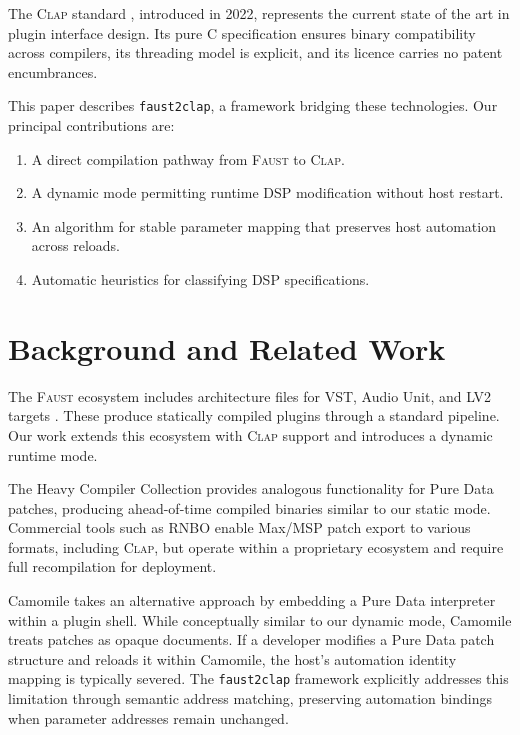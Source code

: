 \documentclass[twoside,a4paper]{article}
\newcommand{\F}{\textsc{Faust}}
\newcommand{\CLAP}{\textsc{Clap}}
\begin{document}
The \CLAP{} standard \cite{CLAP2022}, introduced in 2022, represents the current state of the art in plugin interface design. Its pure C specification ensures binary compatibility across compilers, its threading model is explicit, and its licence carries no patent encumbrances.

This paper describes \texttt{faust2clap}, a framework bridging these technologies. Our principal contributions are:

\begin{enumerate}
\item A direct compilation pathway from \F{} to \CLAP{}.
\item A dynamic mode permitting runtime DSP modification without host restart.
\item An algorithm for stable parameter mapping that preserves host automation across reloads.
\item Automatic heuristics for classifying DSP specifications.
\end{enumerate}

\section{Background and Related Work}
\label{sec:background}

The \F{} ecosystem includes architecture files for VST, Audio Unit, and LV2 targets \cite{FaustArch}. These produce statically compiled plugins through a standard pipeline. Our work extends this ecosystem with \CLAP{} support and introduces a dynamic runtime mode.

The Heavy Compiler Collection \cite{HVCC} provides analogous functionality for Pure Data patches, producing ahead-of-time compiled binaries similar to our static mode. Commercial tools such as RNBO \cite{RNBO} enable Max/MSP patch export to various formats, including \CLAP{}, but operate within a proprietary ecosystem and require full recompilation for deployment.

Camomile \cite{Guillot2018} takes an alternative approach by embedding a Pure Data interpreter within a plugin shell. While conceptually similar to our dynamic mode, Camomile treats patches as opaque documents. If a developer modifies a Pure Data patch structure and reloads it within Camomile, the host's automation identity mapping is typically severed. The \texttt{faust2clap} framework explicitly addresses this limitation through semantic address matching, preserving automation bindings when parameter addresses remain unchanged.
\end{document}
